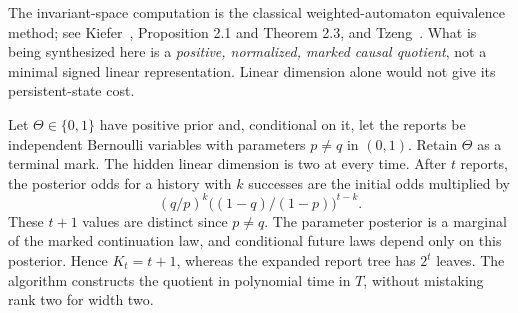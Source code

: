 The invariant-space computation is the classical weighted-automaton
equivalence method; see Kiefer~\cite{Kiefer2020}, Proposition 2.1 and
Theorem 2.3, and Tzeng~\cite{Tzeng1992}. What is being synthesized
here is a \emph{positive, normalized, marked causal quotient}, not a
minimal signed linear representation. Linear dimension alone would
not give its persistent-state cost.

\begin{example}
\label{ex:v10-bernoulli}
Let $\Theta\in\{0,1\}$ have positive prior and, conditional on it,
let the reports be independent Bernoulli variables with parameters
$p\ne q$ in $(0,1)$. Retain $\Theta$ as a terminal mark. The hidden
linear dimension is two at every time. After $t$ reports, the posterior
odds for a history with $k$ successes are the initial odds multiplied by
\[
 (q/p)^k\bigl((1-q)/(1-p)\bigr)^{t-k}.
\]
These $t+1$ values are distinct since $p\ne q$. The parameter posterior
is a marginal of the marked continuation law, and conditional future
laws depend only on this posterior. Hence $K_t=t+1$, whereas the
expanded report tree has $2^t$ leaves. The algorithm constructs the
quotient in polynomial time in $T$, without mistaking rank two for
width two.
\end{example}
